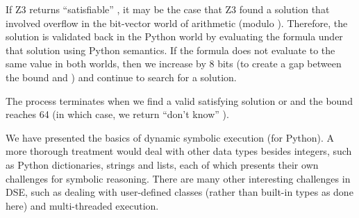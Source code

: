 \documentclass{IOS-Book-Article}
\begin{document}
\begin{mdP}[class={indent},data-line={871}]%
{}If Z3 returns
{}{\textquotedblleft}satisfiable{\textquotedblright}%
{}, it may be the case that Z3 found a solution
that involved overflow in the bit-vector world of arithmetic
(modulo %
{}%
{}). Therefore,
the solution is validated back in the
Python world by evaluating the formula under that solution
using Python semantics. 
If the formula does not evaluate to the same
value in both worlds, then we increase %
{}%
{} by 8 bits (to 
create a gap between the bound and %
{}%
{}) and continue to search
for a solution.%
\end{mdP}%
\begin{mdP}[class={indent},data-line={883}]%
{}The process terminates when we find a valid satisfying solution 
or %
{}%
{} and the bound reaches 64 (in which case, we return %
{}{\textquotedblleft}don{'}t know{\textquotedblright}%
{}).%
\end{mdP}%
\begin{mdP}[data-line={888}]%
{}We have presented the basics of dynamic symbolic execution 
(for Python).
A more thorough treatment would deal with other data types besides
integers, such as Python dictionaries, strings and lists, each
of which presents their own challenges for symbolic reasoning. 
There are many other interesting challenges in DSE, such
as dealing with user-defined classes (rather than built-in types
as done here) and multi-threaded execution.%
\end{mdP}%
\end{document}
